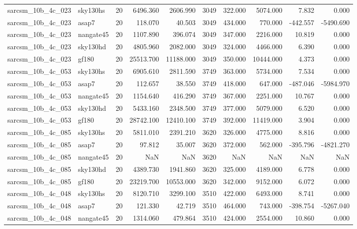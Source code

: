 \documentclass{article}
\begin{document}
\begin{longtable}{llrrrrrrrr}
sarcsm\_10b\_4c\_023 & sky130hs & 20 & 6496.360 & 2606.990 & 3049 & 322.000 & 5074.000 & 7.832 & 0.000 \\
sarcsm\_10b\_4c\_023 & asap7 & 20 & 118.070 & 40.503 & 3049 & 434.000 & 770.000 & -442.557 & -5490.690 \\
sarcsm\_10b\_4c\_023 & nangate45 & 20 & 1107.890 & 396.074 & 3049 & 347.000 & 2216.000 & 10.819 & 0.000 \\
sarcsm\_10b\_4c\_023 & sky130hd & 20 & 4805.960 & 2082.000 & 3049 & 324.000 & 4466.000 & 6.390 & 0.000 \\
sarcsm\_10b\_4c\_023 & gf180 & 20 & 25513.700 & 11188.000 & 3049 & 350.000 & 10444.000 & 4.373 & 0.000 \\
sarcsm\_10b\_4c\_053 & sky130hs & 20 & 6905.610 & 2811.590 & 3749 & 363.000 & 5734.000 & 7.534 & 0.000 \\
sarcsm\_10b\_4c\_053 & asap7 & 20 & 112.657 & 38.550 & 3749 & 418.000 & 647.000 & -487.046 & -5984.970 \\
sarcsm\_10b\_4c\_053 & nangate45 & 20 & 1154.640 & 416.290 & 3749 & 367.000 & 2251.000 & 10.767 & 0.000 \\
sarcsm\_10b\_4c\_053 & sky130hd & 20 & 5433.160 & 2348.500 & 3749 & 377.000 & 5079.000 & 6.520 & 0.000 \\
sarcsm\_10b\_4c\_053 & gf180 & 20 & 28742.100 & 12410.100 & 3749 & 392.000 & 11419.000 & 3.904 & 0.000 \\
sarcsm\_10b\_4c\_085 & sky130hs & 20 & 5811.010 & 2391.210 & 3620 & 326.000 & 4775.000 & 8.816 & 0.000 \\
sarcsm\_10b\_4c\_085 & asap7 & 20 & 97.812 & 35.007 & 3620 & 372.000 & 562.000 & -395.796 & -4821.270 \\
sarcsm\_10b\_4c\_085 & nangate45 & 20 & NaN & NaN & 3620 & NaN & NaN & NaN & NaN \\
sarcsm\_10b\_4c\_085 & sky130hd & 20 & 4389.730 & 1941.860 & 3620 & 325.000 & 4189.000 & 6.778 & 0.000 \\
sarcsm\_10b\_4c\_085 & gf180 & 20 & 23219.700 & 10553.000 & 3620 & 342.000 & 9152.000 & 6.072 & 0.000 \\
sarcsm\_10b\_4c\_048 & sky130hs & 20 & 8120.710 & 3299.100 & 3510 & 422.000 & 6493.000 & 8.741 & 0.000 \\
sarcsm\_10b\_4c\_048 & asap7 & 20 & 121.330 & 42.719 & 3510 & 464.000 & 743.000 & -398.754 & -5267.040 \\
sarcsm\_10b\_4c\_048 & nangate45 & 20 & 1314.060 & 479.864 & 3510 & 424.000 & 2554.000 & 10.860 & 0.000 \\

\end{longtable}
\end{document}
